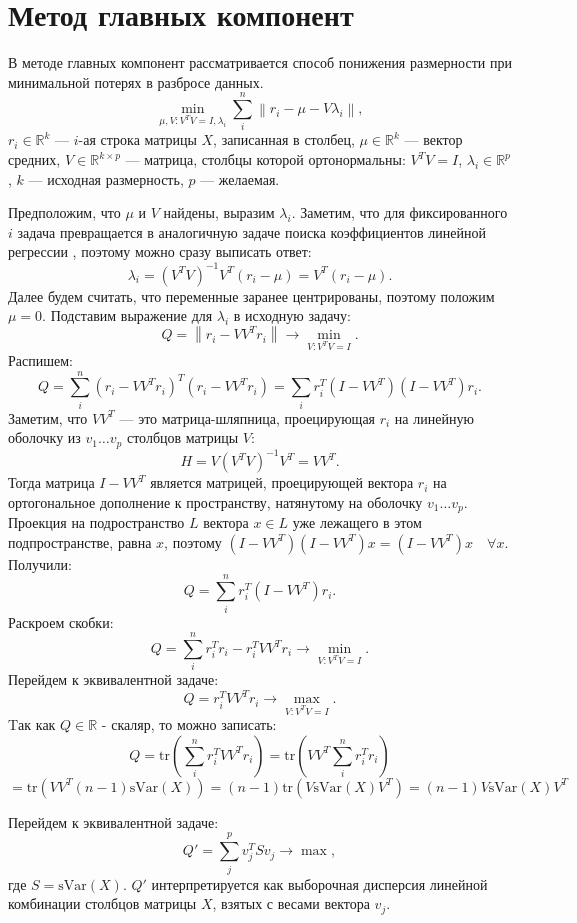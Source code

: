 \documentclass[12pt]{article} %
\theoremstyle{definition} %
\begin{document}
\section{Метод главных компонент}
В методе главных компонент рассматривается способ понижения размерности при минимальной потерях в разбросе данных.
$$\min_{\mu, V: V^TV=I, \lambda_i} \sum_{i}^n \left\|r_i - \mu - V\lambda_i \right\|, $$
$r_i \in \mathbb{R}^k$ — $i$-ая строка матрицы $X$, записанная в столбец,
$\mu \in \mathbb{R}^k$ — вектор средних, $V \in \mathbb{R}^{k \times p}$  —  матрица, столбцы которой ортонормальны: $V^TV=I$, $\lambda_i \in \mathbb{R}^p$, $k$  —  исходная размерность, $p$  —  желаемая.

Предположим, что $\mu$ и $V$ найдены, выразим $\lambda_i$. Заметим, что для фиксированного $i$ задача превращается в аналогичную задаче поиска коэффициентов линейной регрессии , поэтому можно сразу выписать ответ:
$$\lambda_i = (V^TV)^{-1}V^T(r_i-\mu) = V^T(r_i-\mu).$$
Далее будем считать, что переменные заранее центрированы, поэтому положим $\mu=0$.
Подставим выражение для $\lambda_i$ в исходную задачу:
$$Q = \left\| r_i - VV^T r_i \right\| \to \min_{V: V^TV=I} .$$
Распишем:
$$Q = \sum_i^n (r_i - VV^Tr_i)^T (r_i - VV^Tr_i) =
\sum_i r_i^T (I-VV^T)(I-VV^T)r_i.$$
Заметим, что $VV^T$  —  это матрица-шляпница, проецирующая $r_i$ на линейную оболочку из $v_1 \dots v_p$ столбцов матрицы $V$:
$$H = V (V^TV)^{-1} V^T = VV^T.$$
Тогда матрица $I-VV^T$ является матрицей, проецирующей вектора $r_i$ на ортогональное дополнение к пространству, натянутому на оболочку $v_1 \dots v_p$.
Проекция на подространство $L$ вектора $x \in L$ уже лежащего в этом подпространстве, равна $x$, поэтому  $(I-VV^T)(I-VV^T)x=(I-VV^T)x \quad \forall x$.
Получили:
$$Q = \sum_i^n r_i^T(I - VV^T)r_i.$$
Раскроем скобки:
$$Q = \sum_i^n r_i^T r_i - r_i^T VV^T r_i \to \min_{V: V^TV=I}.$$
Перейдем к эквивалентной задаче:
$$Q=r_i^T VV^T r_i \to \max_{V: V^TV=I}.$$
Tак как $Q \in \mathbb{R}$ - скаляр, то можно записать:
$$Q = \text{tr} (\sum_i^n r_i^T VV^T r_i ) =
 \text{tr} (VV^T \sum_i^n r_i^T r_i) $$
 $$
 = \text{tr} (VV^T (n-1)\text{sVar}(X))=
 (n-1)\text{tr} (V \text{sVar}(X) V^T )
 = (n-1) V \text{sVar}(X) V^T$$

Перейдем к эквивалентной задаче:
$$Q' = \sum_{j}^p v_j^T S v_j \to \max,$$
где $S = \text{sVar}(X)$. $Q'$ интерпретируется как выборочная дисперсия линейной комбинации столбцов матрицы $X$, взятых с весами вектора $v_j$.
\end{document}
